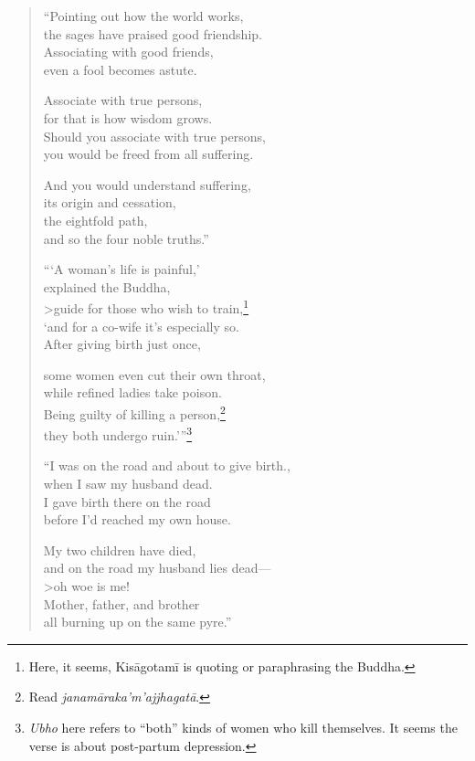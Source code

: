 \documentclass[12pt,openany]{book}%
\begin{document}
\begin{verse}%
“Pointing out how the world works, \\
the sages have praised good friendship. \\
Associating with good friends, \\
even a fool becomes astute. 

Associate with true persons, \\
for that is how wisdom grows. \\
Should you associate with true persons, \\
you would be freed from all suffering. 

And you would understand suffering, \\
its origin and cessation, \\
the eightfold path, \\
and so the four noble truths.” 

“‘A woman’s life is painful,’ \\
explained the Buddha, \\>guide for those who wish to train,\footnote{Here, it seems, \textsanskrit{Kisāgotamī} is quoting or paraphrasing the Buddha. } \\
‘and for a co-wife it’s especially so. \\
After giving birth just once, 

some women even cut their own throat, \\
while refined ladies take poison. \\
Being guilty of killing a person,\footnote{Read \textit{\textsanskrit{janamāraka}’m’\textsanskrit{ajjhagatā}}. } \\
they both undergo ruin.’”\footnote{\textit{Ubho} here refers to “both” kinds of women who kill themselves. It seems the verse is about post-partum depression. } 

“I was on the road and about to give birth., \\
when I saw my husband dead. \\
I gave birth there on the road \\
before I’d reached my own house. 

My two children have died, \\
and on the road my husband lies dead—\\>oh woe is me! \\
Mother, father, and brother \\
all burning up on the same pyre.” 


\end{verse}
\end{document}

